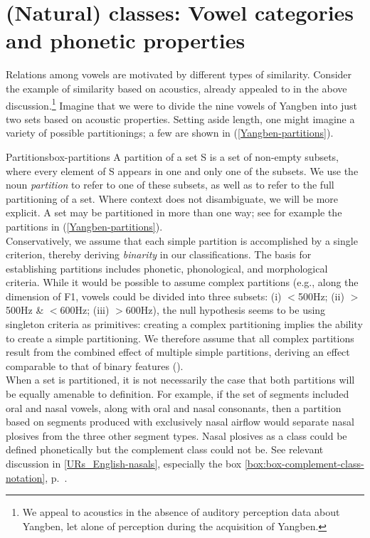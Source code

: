 \section{(Natural) classes: Vowel categories and phonetic properties}\label{section_natural_classes}
Relations among vowels are motivated by different types of similarity. Consider the example of similarity based on acoustics, already appealed to in the above discussion.\footnote{We appeal to acoustics in the absence of auditory perception data about Yangben,  let alone of perception during the acquisition of Yangben. } Imagine that we were to divide the nine vowels of Yangben  into just two sets based on acoustic properties. Setting aside length, one might imagine a variety of possible partitionings; a few are shown in (\ref{Yangben-partitions}). 

\begin{dadpbox}{Partitions}{box-partitions}
A partition of a set S is a set of non-empty subsets, where every element of S appears in  one and only one of the subsets. We use the noun \textit{partition} to refer to one of these subsets, as well as to refer to the full partitioning of a set. Where context does not disambiguate, we will be more explicit. A set may be partitioned in more than one way; see for example the partitions in (\ref{Yangben-partitions}). \\

Conservatively, we assume that each simple partition is accomplished by a single criterion, thereby deriving {\it binarity} in our classifications. The basis for establishing partitions includes phonetic, phonological, and morphological criteria. While it would be possible to assume complex partitions (e.g., along the dimension of F1, vowels could be divided into three subsets: (i) $<$500Hz; (ii) $>$500Hz \& $<$600Hz; (iii) $>$600Hz), the null hypothesis seems to be using singleton criteria as primitives: creating a complex partitioning implies the ability to create a simple partitioning. We therefore assume that all complex partitions result from the combined effect of multiple simple partitions, deriving an effect comparable to that of binary features (\citealt{Chomsky+:1968}).\\

When a set is partitioned, it is not necessarily the case that both partitions will be equally amenable to definition. For example, if the set of segments included oral and nasal vowels, along with oral and nasal consonants, then a partition based on segments produced with exclusively nasal airflow would separate nasal plosives from the three other segment types. Nasal plosives as a class could be defined phonetically  but the complement class could not be. See relevant discussion in \textsection\ref{URs_English-nasals}, especially the box \ref{box:box-complement-class-notation}, p.\ \pageref{box:box-complement-class-notation}.
\end{dadpbox}

